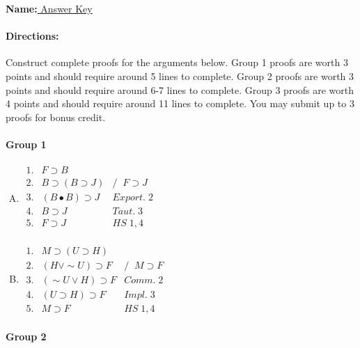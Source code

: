 \documentclass[10pt]{article}
\begin{document}
\small

\textbf{Name:}\underline{  Answer Key  }

\paragraph{Directions:} Construct complete proofs for the arguments below. Group 1 proofs are worth 3 points and should require around 5 lines to complete. Group 2 proofs are worth 3 points and should require around 6-7 lines to complete. Group 3 proofs are worth 4 points and should require around 11 lines to complete. You may submit up to 3 proofs for bonus credit.

\begin{multicols}{2}
\paragraph{Group 1}

\begin{enumerate}[A.]
  \item $\begin{array}{lll}
         1. & F \supset B & \\
         2. & B \supset ( B \supset J ) & /\;\; F \supset J \\
         3. & (B \bullet B) \supset J & Export. \;2 \\
         4. & B \supset J & Taut. \;3 \\
         5. & F \supset J & HS \; 1,4 \\
        \end{array}$
        
  \item $\begin{array}{lll}
         1. & M \supset ( U \supset H ) & \\
         2. & (H \vee \sim\! U) \supset F & /\;\; M \supset F \\
         3. & (\sim\!U \vee H) \supset F & Comm. \;2 \\
         4. & (U \supset H) \supset F & Impl. \;3 \\
         5. & M \supset F & HS \; 1,4
        \end{array}$
\end{enumerate}

\columnbreak

\paragraph{Group 2}


\end{multicols}
\end{document}
